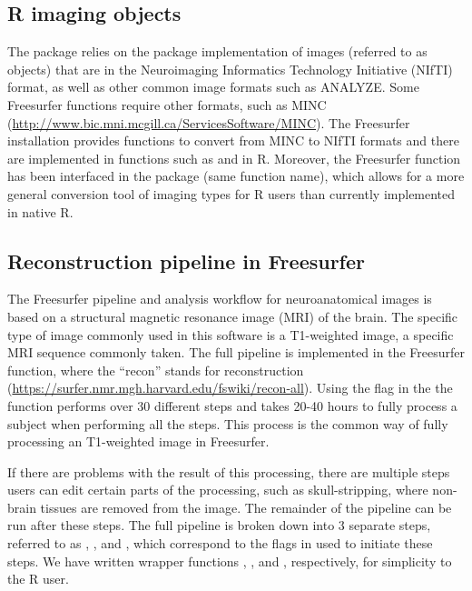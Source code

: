 \subsection{R imaging objects}\label{r-imaging-objects}

The  package relies on the 
\citep{whitcher_working_2011} package implementation of images (referred
to as  objects) that are in the Neuroimaging Informatics
Technology Initiative (NIfTI) format, as well as other common image
formats such as ANALYZE. Some Freesurfer functions require other
formats, such as MINC
(\url{http://www.bic.mni.mcgill.ca/ServicesSoftware/MINC}). The
Freesurfer installation provides functions to convert from MINC to NIfTI
formats and there are implemented in functions such as 
and  in R. Moreover, the  Freesurfer
function has been interfaced in the  package (same
function name), which allows for a more general conversion tool of
imaging types for R users than currently implemented in native R.

\subsection{Reconstruction pipeline in
Freesurfer}\label{reconstruction-pipeline-in-freesurfer}

The Freesurfer pipeline and analysis workflow for neuroanatomical images
is based on a structural magnetic resonance image (MRI) of the brain.
The specific type of image commonly used in this software is a
T1-weighted image, a specific MRI sequence commonly taken. The full
pipeline is implemented in the Freesurfer  function,
where the ``recon'' stands for reconstruction
(\url{https://surfer.nmr.mgh.harvard.edu/fswiki/recon-all}). Using the
 flag in the the  function performs over 30
different steps and takes 20-40 hours to fully process a subject when
performing all the steps. This process is the common way of fully
processing an T1-weighted image in Freesurfer.

If there are problems with the result of this processing, there are
multiple steps users can edit certain parts of the processing, such as
skull-stripping, where non-brain tissues are removed from the image. The
remainder of the pipeline can be run after these steps. The full
pipeline is broken down into 3 separate steps, referred to as
, , and , which
correspond to the flags in  used to initiate these
steps. We have written wrapper functions ,
, and , respectively, for simplicity
to the R user.

